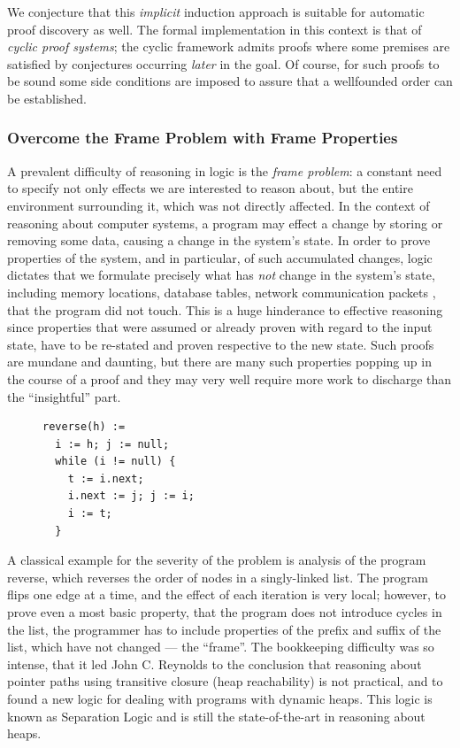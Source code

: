 We conjecture that this \emph{implicit} induction approach is suitable for
automatic proof discovery as well.
The formal implementation in this context is that of \emph{cyclic proof systems};
the cyclic framework admits proofs where some premises are satisfied by
conjectures occurring \emph{later} in the goal.
Of course, for such proofs to be sound some side conditions are imposed to assure
that a wellfounded order can be established.


\subsubsection{Overcome the Frame Problem with Frame Properties}

A prevalent difficulty of reasoning in logic is the \emph{frame problem}:
a constant need to specify not only effects we are interested to reason about,
but the entire environment surrounding it, which was not directly affected.
In the context of reasoning about computer systems, a program may effect a change
by storing or removing some data, causing a change in the system's state.
In order to prove properties of the system, and in particular, of such
accumulated changes, logic dictates that we formulate precisely what has
\emph{not} change in the system's state, including memory locations, database
tables, network communication packets \etc, that the program did not touch.
This is a huge hinderance to effective reasoning since properties that were
assumed or already proven with regard to the input state, have to be
re-stated and proven respective to the new state.
Such proofs are mundane and daunting, but there are many such properties
popping up in the course of a proof and they may very well require more work to
discharge than the ``insightful'' part.

\begin{figure}
\begin{lstlisting}
reverse(h) :=
  i := h; j := null;
  while (i != null) {
    t := i.next;
    i.next := j; j := i;
    i := t;
  }
\end{lstlisting}
\end{figure}

A classical example for the severity of the problem is analysis of the program
\textsf{reverse}, which reverses the order of nodes in a singly-linked list.
The program flips one edge at a time, and the effect of each iteration is
very local; however, to prove even a most basic property, that the program does
not introduce cycles in the list, the programmer has to include properties of
the prefix and suffix of the list, which have not changed --- the ``frame''.
The bookkeeping difficulty was so intense, that it led John C. Reynolds to the
conclusion that reasoning about pointer paths using transitive closure (heap
reachability) is not practical, and to found a new logic for dealing with
programs with dynamic heaps.
This logic is known as Separation Logic and is still the state-of-the-art in
reasoning about heaps.


